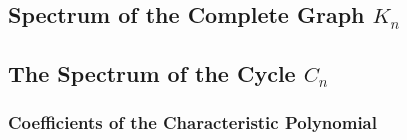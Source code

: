 \subsection{Spectrum of the Complete Graph $K_n$}
\subsection{The Spectrum of the Cycle $C_n$}
\subsubsection{Coefficients of the Characteristic Polynomial}
